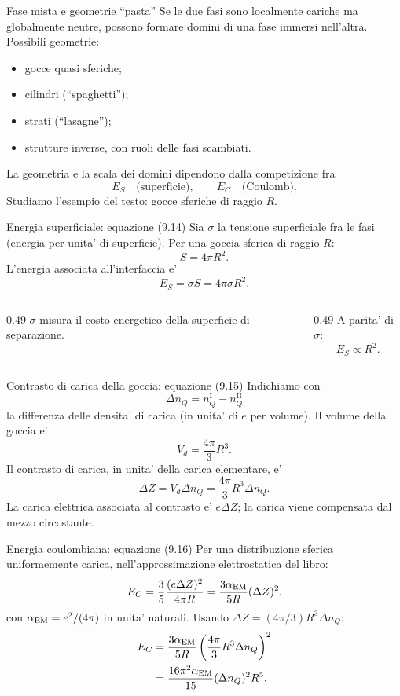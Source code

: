 \begin{frame}{Fase mista e geometrie ``pasta''}
\small
Se le due fasi sono localmente cariche ma globalmente neutre,
possono formare domini di una fase immersi nell'altra.
\medskip
Possibili geometrie:
\begin{itemize}
\item gocce quasi sferiche;
\item cilindri (``spaghetti'');
\item strati (``lasagne'');
\item strutture inverse, con ruoli delle fasi scambiati.
\end{itemize}
\medskip
La geometria e la scala dei domini dipendono dalla competizione fra
\[
E_S\quad\text{(superficie)},
\qquad E_C\quad\text{(Coulomb)}.
\]
Studiamo l'esempio del testo: gocce sferiche di raggio $R$.
\end{frame}

\begin{frame}{Energia superficiale: equazione (9.14)}
\small
Sia $\sigma$ la tensione superficiale fra le fasi
(energia per unita' di superficie).
\medskip
Per una goccia sferica di raggio $R$:
\[
S=4\pi R^2.
\]
L'energia associata all'interfaccia e'
\[
E_S=\sigma S=4\pi\sigma R^2.
\]
\begin{columns}[T,onlytextwidth]
\begin{column}{0.49\textwidth}
$\sigma$ misura il costo energetico della superficie di separazione.
\end{column}
\begin{column}{0.49\textwidth}
A parita' di $\sigma$:
\[
E_S\propto R^2.
\]
\end{column}
\end{columns}
\end{frame}

\begin{frame}{Contrasto di carica della goccia: equazione (9.15)}
\small
Indichiamo con
\[
\Delta n_Q=n_Q^{\mathrm I}-n_Q^{\mathrm{II}}
\]
la differenza delle densita' di carica (in unita' di $e$ per volume).
\medskip
Il volume della goccia e'
\[
V_d=\frac{4\pi}{3}R^3.
\]
Il contrasto di carica, in unita' della carica elementare, e'
\[
\Delta Z=V_d\Delta n_Q
=\frac{4\pi}{3}R^3\Delta n_Q.
\]
La carica elettrica associata al contrasto e' $e\Delta Z$;
la carica viene compensata dal mezzo circostante.
\end{frame}

\begin{frame}{Energia coulombiana: equazione (9.16)}
\small
Per una distribuzione sferica uniformemente carica,
nell'approssimazione elettrostatica del libro:
\[
E_C=\frac35\frac{(e\Delta Z)^2}{4\pi R}
=\frac{3\alpha_{\rm EM}}{5R}(\Delta Z)^2,
\]
con $\alpha_{\rm EM}=e^2/(4\pi)$ in unita' naturali.
\medskip
Usando $\Delta Z=(4\pi/3)R^3\Delta n_Q$:
\[
\begin{aligned}
E_C&=\frac{3\alpha_{\rm EM}}{5R}
\left(\frac{4\pi}{3}R^3\Delta n_Q\right)^2\\
&=\frac{16\pi^2\alpha_{\rm EM}}{15}
(\Delta n_Q)^2R^5.
\end{aligned}
\]
\end{frame}

